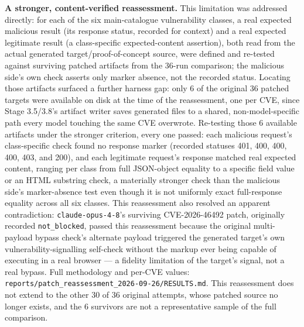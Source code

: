\documentclass[12pt,a4paper]{report}
\begin{document}
\textbf{A stronger, content-verified reassessment.} This limitation was addressed directly: for each of the six main-catalogue vulnerability classes, a real expected malicious result (its response status, recorded for context) and a real expected legitimate result (a class-specific expected-content assertion), both read from the actual generated target/proof-of-concept source, were defined and re-tested against surviving patched artifacts from the 36-run comparison; the malicious side's own check asserts only marker absence, not the recorded status. Locating those artifacts surfaced a further harness gap: only 6 of the original 36 patched targets were available on disk at the time of the reassessment, one per CVE, since Stage 3.5/3.8's artifact writer saves generated files to a shared, non-model-specific path every model touching the same CVE overwrote. Re-testing those 6 available artifacts under the stronger criterion, every one passed: each malicious request's class-specific check found no response marker (recorded statuses 401, 400, 400, 400, 403, and 200), and each legitimate request's response matched real expected content, ranging per class from full JSON-object equality to a specific field value or an HTML substring check, a materially stronger check than the malicious side's marker-absence test even though it is not uniformly exact full-response equality across all six classes. This reassessment also resolved an apparent contradiction: \texttt{claude-opus-4-8}'s surviving CVE-2026-46492 patch, originally recorded \texttt{not\_blocked}, passed this reassessment because the original multi-payload bypass check's alternate payload triggered the generated target's own vulnerability-signalling self-check without the markup ever being capable of executing in a real browser — a fidelity limitation of the target's signal, not a real bypass. Full methodology and per-CVE values: \texttt{reports/\allowbreak patch\_reassessment\_2026-09-26/\allowbreak RESULTS.md}. This reassessment does not extend to the other 30 of 36 original attempts, whose patched source no longer exists, and the 6 survivors are not a representative sample of the full comparison.
\end{document}
